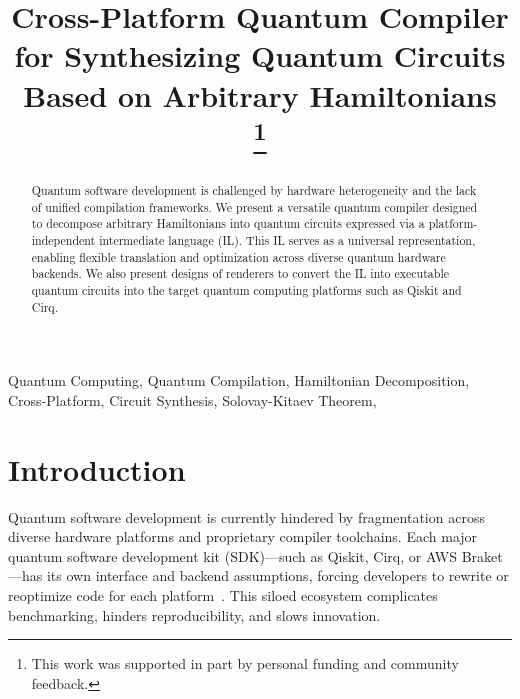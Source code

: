 \documentclass[conference]{IEEEtran}
\begin{document}
    \title{Cross-Platform Quantum Compiler for Synthesizing Quantum Circuits Based on Arbitrary Hamiltonians \\
    \thanks{This work was supported in part by personal funding and community feedback.}
    }

    \author{
    }

    \maketitle

    \begin{abstract}
        Quantum software development is challenged by hardware heterogeneity and the lack of unified compilation frameworks.
        We present a versatile quantum compiler designed to decompose arbitrary Hamiltonians into quantum circuits expressed via a platform-independent intermediate language (IL).
        This IL serves as a universal representation, enabling flexible translation and optimization across diverse quantum hardware backends.
        We also present designs of renderers to convert the IL into executable quantum circuits into the target quantum computing platforms such as Qiskit and Cirq.
    \end{abstract}

    \begin{IEEEkeywords}
        Quantum Computing, Quantum Compilation, Hamiltonian Decomposition, Cross-Platform, Circuit Synthesis, Solovay-Kitaev Theorem,
    \end{IEEEkeywords}


    \section{Introduction}\label{sec:introduction}

    Quantum software development is currently hindered by fragmentation across diverse hardware platforms and proprietary compiler toolchains.
    Each major quantum software development kit (SDK)—such as Qiskit, Cirq, or AWS Braket—has its own interface and backend assumptions,
    forcing developers to rewrite or reoptimize code for each platform~\cite{qiskit2023,cirq2024,braket-zenodo}.
    This siloed ecosystem complicates benchmarking, hinders reproducibility, and slows innovation.
\end{document}
